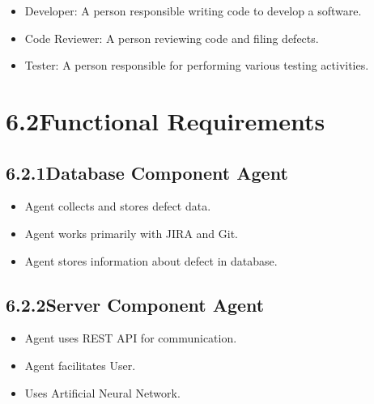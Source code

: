 \documentclass[oneside,a4paper,12pt]{book}
\begin{document}
\setlength{\parskip}{0.0pt}
\begin{itemize}
	\item Developer: A person responsible writing code to develop a software.\par

	\item Code Reviewer: A person reviewing code and filing defects.\par

	\item Tester: A person responsible for performing various testing activities.
\end{itemize}\par

\setlength{\parskip}{9.96pt}
\section*{6.2\hspace*{10pt}Functional Requirements}
\subsection*{6.2.1\hspace*{10pt}Database Component Agent}
\setlength{\parskip}{0.0pt}
\begin{itemize}
	\item Agent collects and stores defect data.\par

	\item Agent works primarily with JIRA and Git.\par

\setlength{\parskip}{9.96pt}
	\item Agent stores information about defect in database.
\end{itemize}\par


\vspace{\baselineskip}
\subsection*{6.2.2\hspace*{10pt}Server Component Agent}
\setlength{\parskip}{0.0pt}
\begin{itemize}
	\item Agent uses REST API for communication.\par

	\item Agent facilitates User.\par

	\item Uses Artificial Neural Network.
\end{itemize}\par
\end{document}
